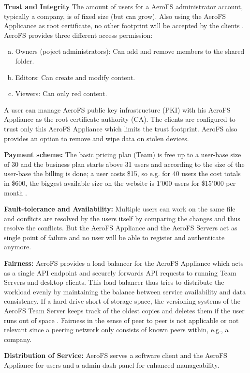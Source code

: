 \textbf{Trust and Integrity} The amount of users for a AeroFS administrator account, typically a company, is of fixed size (but can grow). Also using the AeroFS Applicance as root certificate, no other footprint will be accepted by the clients \cite{aerofs:security}. AeroFS provides three different access permission:
\begin{enumerate}[(a)]
\item Owners (poject administrators): Can add and remove members to the shared folder.
\item Editors: Can create and modify content.
\item Viewers: Can only red content.
\end{enumerate}
A user can manage AeroFS  public key infrastructure (PKI) with his AeroFS Appliance as the root certificate authority (CA). The clients are configured to trust only this AeroFS Appliance which limits the trust footprint. AeroFS also provides an option to remove and wipe data on stolen devices.

\textbf{Payment scheme:} The basic pricing plan (Team) is free up to a user-base size of 30 \cite{aerofs:blog:30_users_free} and the business plan starts above 31 users and according to the size of the user-base the billing is done; a user costs \$15, so e.g. for 40 users the cost totals in \$600, the biggest available size on the website is 1'000 users for \$15'000 per month \cite{aerofs:pricing}.

\textbf{Fault-tolerance and Availability:} Multiple users can work on the same file and conflicts are resolved by the users itself by comparing the changes and thus resolve the conflicts. But the AeroFS Appliance and the AeroFS Servers act as single point of failure and no user will be able to register and authenticate anymore.

\textbf{Fairness:} AeroFS provides a load balancer for the AeroFS Appliance which acts as a single API endpoint and securely forwards API requests to running Team Servers and desktop clients. This load balancer thus tries to distribute the workload evenly by maintaining the balance between service availability and data consistency.
If a hard drive short of storage space, the versioning systems of the AeroFS Team Server keeps track of the oldest copies and deletes them if the user runs out of space \cite{aerofs:USTO.RE}.
Fairness in the sense of peer to peer is not applicable or not relevant since a peering network only consists of known peers within, e.g., a company.

\textbf{Distribution of Service:} AeroFS serves a software client and the AeroFS Appliance for users and a admin dash panel for enhanced manageability.

